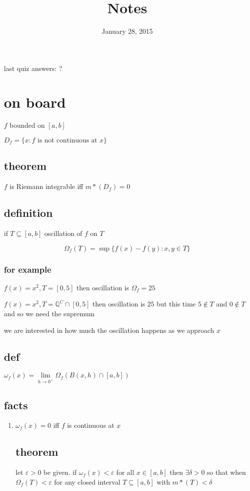 \documentclass[letterpaper]{article}
\begin{document}
\title{Notes}
\date{January 28, 2015}
\maketitle
last quiz answers:
?

\section*{on board}
$f$ bounded on $[a,b]$

$D_f=\{x:f\text{ is not continuous at } x\}$

\subsection*{theorem}
$f$ is Riemann integrable iff $m*(D_f)=0$

\subsection*{definition}
if $T\subseteq [a,b]$ oscillation of $f$ on $T$

\[\Omega_f(T)=\sup\{f(x)-f(y):x,y\in T\}\]

\subsubsection*{for example}
$f(x)=x^2, T=[0,5]$ then oscillation is $\Omega_f=25$

$f(x)=x^2, T=\mathbb{Q}^C\cap [0,5]$ then oscillation is $25$ but this time $5\not\in T$ and $0\not\in T$ and so we need the supremum

we are interested in how much the oscillation happens as we approach $x$

\subsection*{def}
$\omega_f(x)=\lim\limits_{h\to0^+}\Omega_f(B(x,h)\cap[a,b])$

\subsection*{facts}
\begin{enumerate}
\item
$\omega_f(x)=0$ iff $f$ is continuous at $x$

\subsection*{theorem}
let $\varepsilon>0$ be given. if $\omega_f(x)<\varepsilon$ for all $x\in [a,b]$ then $\exists\delta>0$ so that when $\Omega_f(T)<\varepsilon$ for any closed interval $T\subseteq[a,b]$ with $m*(T)<\delta$

\end{enumerate}
\end{document}

